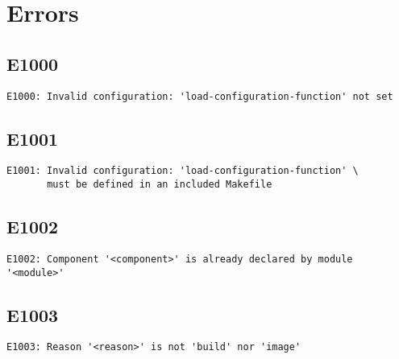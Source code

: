 %
%
%
%
\chapter{Errors}

\section{E1000}

\begin{verbatim}
E1000: Invalid configuration: 'load-configuration-function' not set
\end{verbatim}

\section{E1001}

\begin{verbatim}
E1001: Invalid configuration: 'load-configuration-function' \
       must be defined in an included Makefile
\end{verbatim}

\section{E1002}

\begin{verbatim}
E1002: Component '<component>' is already declared by module '<module>'
\end{verbatim}

\section{E1003}

\begin{verbatim}
E1003: Reason '<reason>' is not 'build' nor 'image'
\end{verbatim}

